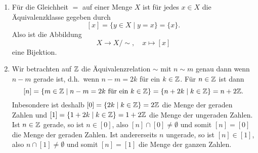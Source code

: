 \begin{bsp}
 \begin{enumerate}[leftmargin=*]
  \item
   Für die Gleichheit $=$ auf einer Menge $X$ ist für jedes $x \in X$ die Äquivalenzklasse gegeben durch
   \[
    [x] = \{y \in X \mid y = x\} = \{x\}.
   \]
   Also ist die Abbildung
   \[
    X \to X/{\sim}, \quad x \mapsto [x]
   \]
   eine Bijektion.
  \item
   Wir betrachten auf $\mathbb{Z}$ die Äquivalenzrelation $\sim$ mit $n \sim m$ genau dann wenn $n-m$ gerade ist, d.h.\ wenn $n-m = 2k$ für ein $k \in \mathbb{Z}$. Für $n \in \mathbb{Z}$ ist dann
   \[
    [n]
    = \{m \in \mathbb{Z} \mid \text{$n-m = 2k$ für ein $k \in \mathbb{Z}$}\}
    = \{n + 2k \mid k \in \mathbb{Z}\}
    = n+2\mathbb{Z}.
   \]
   Inbesondere ist deshalb $[0] = \{2k \mid k \in \mathbb{Z}\} = 2\mathbb{Z}$ die Menge der geraden Zahlen und $[1] = \{1+2k \mid k \in \mathbb{Z}\} = 1+2\mathbb{Z}$ die Menge der ungeraden Zahlen. Ist $n \in \mathbb{Z}$ gerade, so ist $n \in [0]$, also $[n] \cap [0] \neq \emptyset$ und somit $[n] = [0]$ die Menge der geraden Zahlen. Ist andererseits $n$ ungerade, so ist $[n] \in [1]$, also $n \cap [1] \neq \emptyset$ und somit $[n] = [1]$ die Menge der ganzen Zahlen.
   

\end{enumerate}
\end{bsp}
